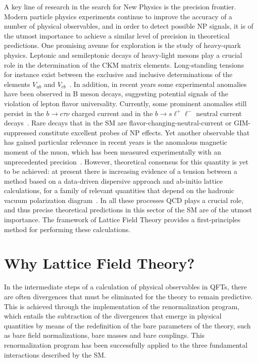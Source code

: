 A key line of research in the search for New Physics is the precision frontier. Modern particle physics experiments continue to improve the accuracy of a number of physical observables, and in order to detect possible NP signals, it is of the utmost importance to achieve a similar level of precision in theoretical predictions. One promising avenue for exploration is the study of heavy-quark physics. Leptonic and semileptonic decays of heavy-light mesons play a crucial role in the determination of the CKM matrix elements. Long-standing tensions for instance exist between the exclusive and inclusive determinations of the elements $V_{ub}$ and $V_{cb}$~\citep{Ricciardi:2019zph}. In addition, in recent years some experimental anomalies have been observed in B meson decays, suggesting potential signals of the violation of lepton flavor universality. Currently, some prominent anomalies still persist  in the  $b\to c\tau\nu$ charged current and in the  $b\to s\ell^+\ell^-$ neutral current  decays~\citep{Capdevila:2023yhq}. Rare decays that in the SM are flavor-changing-neutral-current  or GIM-suppressed  constitute excellent probes of NP effects. Yet another observable that has gained particular relevance in recent years is the anomalous magnetic moment of the muon, which has been measured experimentally with an unprecedented precision~\citep{Muong-2:2006rrc,PhysRevLett.131.161802}. However, theoretical consensus for this quantity is yet to be achieved: at present there is increasing evidence of a tension between a method based on a data-driven dispersive approach and ab-initio lattice calculations, for a family of relevant quantities that depend on the hadronic vacuum polarization diagram~\citep{DellaMorte:2017dyu,Jegerlehner:2017lbd,RBC:2018dos,Giusti:2019xct,Benayoun:2019zwh,Keshavarzi:2019abf,FermilabLattice:2019ugu,Gerardin:2019rua,Borsanyi:2020mff,Ce:2022kxy,Kuberski:2024bcj,Boccaletti:2024guq}. In all these processes QCD plays a crucial role, and thus precise theoretical predictions in this sector of the SM are of the utmost importance. The framework of Lattice Field Theory provides a first-principles method for performing these calculations.

\section*{Why Lattice Field Theory?}

In the intermediate steps of a calculation of physical observables in QFTs, there are often divergences that must be eliminated for the theory to remain predictive. This is achieved through the implementation of the renormalization program, which entails the subtraction of the divergences that emerge in physical quantities by means of the redefinition of the bare parameters of the theory, such as bare field normalizations, bare masses and bare couplings. This renormalization program has been successfully applied to the three fundamental interactions described by the SM.

